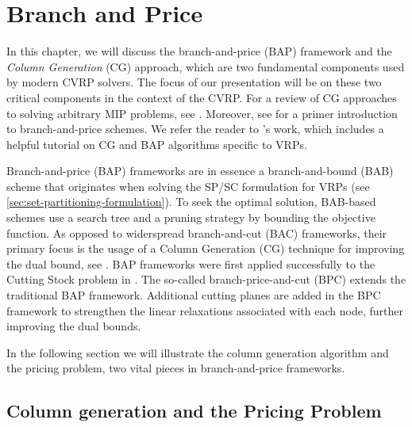 \chapter{Branch and Price}
\label{sec:branch-and-price}

In this chapter,
we will discuss the branch-and-price (BAP) framework and the \textit{Column Generation} (CG) approach,
which are two fundamental components used by modern CVRP solvers.
The focus of our presentation will be on these two critical components in the context of the CVRP.
For a review of CG approaches to solving arbitrary MIP problems, see \textcite{vanderbeck2005, lubbecke2005, desrosiers2011}.
Moreover, see \textcite{barnhart1998, desrosiers2005}
for a primer introduction to branch-and-price schemes.
We refer the reader to \textcite{feillet2010}'s work,
which includes a helpful tutorial on CG and BAP algorithms specific to VRPs.

Branch-and-price (BAP) frameworks are in essence a branch-and-bound (BAB) scheme \parencite{land2010}
that originates when solving the SP/SC formulation for VRPs (see \cref{sec:set-partitioning-formulation}).
To seek the optimal solution,
BAB-based schemes use a search tree and a pruning strategy by bounding the objective function.
As opposed to widerspread branch-and-cut (BAC) frameworks,
their primary focus is the usage of a Column Generation (CG) technique for improving the dual bound,
see \textcite{righini2008}.
BAP frameworks were first applied successfully to the Cutting Stock problem in \textcite{gilmore1961}.
The so-called branch-price-and-cut (BPC) extends the traditional BAP framework.
Additional cutting planes are added in the BPC framework to strengthen the linear relaxations
associated with each node, further improving the dual bounds.

In the following section 
we will illustrate the column generation algorithm
and the pricing problem, two vital pieces in branch-and-price frameworks.

\section{Column generation and the Pricing Problem}
\label{sec:column-generation-and-pricing-problem}

